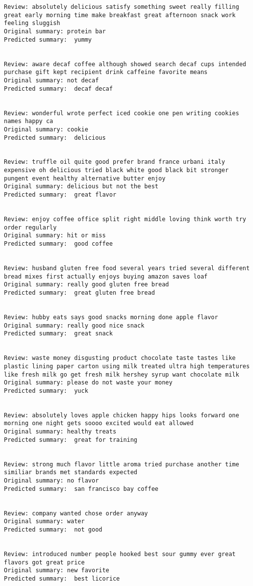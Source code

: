 \documentclass[11pt]{article}
\begin{document}
\begin{Verbatim}[commandchars=\\\{\}]
Review: absolutely delicious satisfy something sweet really filling great early morning time make breakfast great afternoon snack work feeling sluggish 
Original summary: protein bar 
Predicted summary:  yummy


Review: aware decaf coffee although showed search decaf cups intended purchase gift kept recipient drink caffeine favorite means 
Original summary: not decaf 
Predicted summary:  decaf decaf


Review: wonderful wrote perfect iced cookie one pen writing cookies names happy ca 
Original summary: cookie 
Predicted summary:  delicious


Review: truffle oil quite good prefer brand france urbani italy expensive oh delicious tried black white good black bit stronger pungent event healthy alternative butter enjoy 
Original summary: delicious but not the best 
Predicted summary:  great flavor


Review: enjoy coffee office split right middle loving think worth try order regularly 
Original summary: hit or miss 
Predicted summary:  good coffee


Review: husband gluten free food several years tried several different bread mixes first actually enjoys buying amazon saves loaf 
Original summary: really good gluten free bread 
Predicted summary:  great gluten free bread


Review: hubby eats says good snacks morning done apple flavor 
Original summary: really good nice snack 
Predicted summary:  great snack


Review: waste money disgusting product chocolate taste tastes like plastic lining paper carton using milk treated ultra high temperatures like fresh milk go get fresh milk hershey syrup want chocolate milk 
Original summary: please do not waste your money 
Predicted summary:  yuck


Review: absolutely loves apple chicken happy hips looks forward one morning one night gets soooo excited would eat allowed 
Original summary: healthy treats 
Predicted summary:  great for training


Review: strong much flavor little aroma tried purchase another time similiar brands met standards expected 
Original summary: no flavor 
Predicted summary:  san francisco bay coffee


Review: company wanted chose order anyway 
Original summary: water 
Predicted summary:  not good


Review: introduced number people hooked best sour gummy ever great flavors got great price 
Original summary: new favorite 
Predicted summary:  best licorice



\end{Verbatim}
\end{document}
